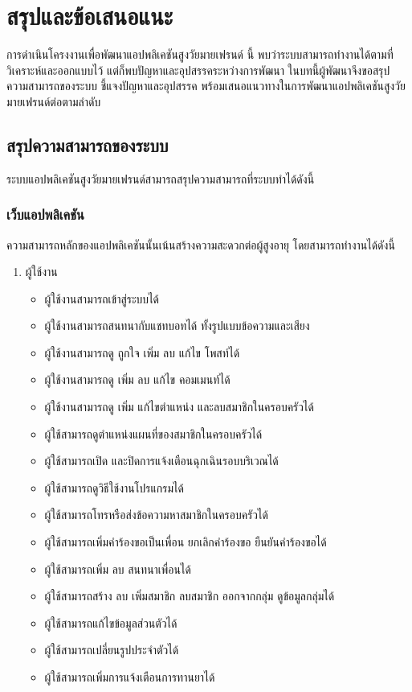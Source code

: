 \chapter{สรุปและข้อเสนอแนะ}

การดำเนินโครงงานเพื่อพัฒนาแอปพลิเคชันสูงวัยมายเฟรนด์ นี้ พบว่าระบบสามารถทำงานได้ตามที่วิเคราะห์และออกแบบไว้ แต่ก็พบปัญหาและอุปสรรคระหว่างการพัฒนา ในบทนี้ผู้พัฒนาจึงขอสรุปความสามารถของระบบ ชี้แจงปัญหาและอุปสรรค พร้อมเสนอแนวทางในการพัฒนาแอปพลิเคชันสูงวัยมายเฟรนด์ต่อตามลำดับ

\section{สรุปความสามารถของระบบ}
	ระบบแอปพลิเคชันสูงวัยมายเฟรนด์สามารถสรุปความสามารถที่ระบบทำได้ดังนี้
	\subsection{เว็บแอปพลิเคชัน}
	ความสามารถหลักของแอปพลิเคชันนั้นเน้นสร้างความสะดวกต่อผู้สูงอายุ โดยสามารถทำงานได้ดังนี้
		\begin{enumerate}
			 \item ผู้ใช้งาน
				 \begin{itemize}
				 	\item ผู้ใช้งานสามารถเข้าสู่ระบบได้
				 	\item ผู้ใช้งานสามารถสนทนากับแชทบอทได้ ทั้งรูปแบบข้อความและเสียง
				 	\item ผู้ใช้งานสามารถดู ถูกใจ เพิ่ม ลบ แก้ไข โพสท์ได้
				 	\item ผู้ใช้งานสามารถดู เพิ่ม ลบ แก้ไข คอมเมนท์ได้
				 	\item ผู้ใช้งานสามารถดู เพิ่ม แก้ไขตำแหน่ง และลบสมาชิกในครอบครัวได้
				 	\item ผู้ใช้สามารถดูตำแหน่งแผนที่ของสมาชิกในครอบครัวได้
				 	\item ผู้ใช้สามารถเปิด และปิดการแจ้งเตือนฉุกเฉินรอบบริเวณได้
				 	\item ผู้ใช้สามารถดูวิธีใช้งานโปรแกรมได้
				 	\item ผู้ใช้สามารถโทรหรือส่งข้อความหาสมาชิกในครอบครัวได้
				 	\item ผู้ใช้สามารถเพิ่มคำร้องขอเป็นเพื่อน ยกเลิกคำร้องขอ ยืนยันคำร้องขอได้
				 	\item ผู้ใช้สามารถเพิ่ม ลบ สนทนาเพื่อนได้
				 	\item ผู้ใช้สามารถสร้าง ลบ เพิ่มสมาชิก ลบสมาชิก ออกจากกลุ่ม ดูข้อมูลกลุ่มได้
				 	\item ผู้ใช้สามารถแก้ไขข้อมูลส่วนตัวได้
				 	\item ผู้ใช้สามารถเปลี่ยนรูปประจำตัวได้
				 	\item ผู้ใช้สามารถเพิ่มการแจ้งเตือนการทานยาได้
				 \end{itemize}
		\end{enumerate}
	
